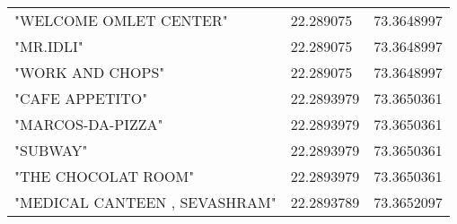 \begin{center}
\begin{longtable}{|l|l|l|}
"WELCOME OMLET CENTER" & 22.289075 & 73.3648997 \\
"MR.IDLI" & 22.289075 & 73.3648997 \\
"WORK AND CHOPS" & 22.289075 & 73.3648997 \\
"CAFE APPETITO" & 22.2893979 & 73.3650361 \\
"MARCOS-DA-PIZZA" & 22.2893979 & 73.3650361 \\
"SUBWAY" & 22.2893979 & 73.3650361 \\
"THE CHOCOLAT ROOM" & 22.2893979 & 73.3650361 \\
"MEDICAL CANTEEN , SEVASHRAM" & 22.2893789 & 73.3652097 \\

\end{longtable}
\end{center}

